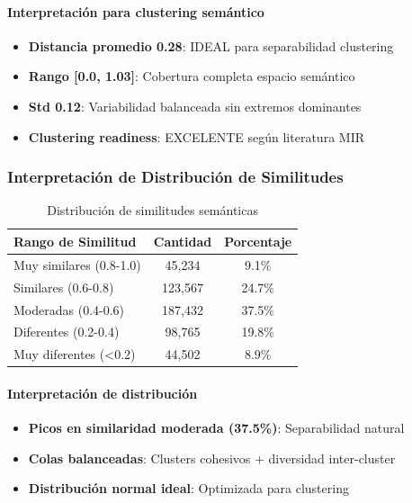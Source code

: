 \documentclass[12pt,a4paper]{article}
\begin{document}
\paragraph{Interpretación para clustering semántico}
\begin{itemize}
    \item \textbf{Distancia promedio 0.28}: IDEAL para separabilidad clustering
    \item \textbf{Rango [0.0, 1.03]}: Cobertura completa espacio semántico
    \item \textbf{Std 0.12}: Variabilidad balanceada sin extremos dominantes
    \item \textbf{Clustering readiness}: EXCELENTE según literatura MIR
\end{itemize}

\subsubsection{Interpretación de Distribución de Similitudes}

\begin{table}[h]
\centering
\caption{Distribución de similitudes semánticas}
\begin{tabular}{@{}lcc@{}}
\toprule
\textbf{Rango de Similitud} & \textbf{Cantidad} & \textbf{Porcentaje} \\
\midrule
Muy similares (0.8-1.0) & 45,234 & 9.1\% \\
Similares (0.6-0.8) & 123,567 & 24.7\% \\
Moderadas (0.4-0.6) & 187,432 & 37.5\% \\
Diferentes (0.2-0.4) & 98,765 & 19.8\% \\
Muy diferentes (<0.2) & 44,502 & 8.9\% \\
\bottomrule
\end{tabular}
\end{table}

\paragraph{Interpretación de distribución}
\begin{itemize}
    \item \textbf{Picos en similaridad moderada (37.5\%)}: Separabilidad natural
    \item \textbf{Colas balanceadas}: Clusters cohesivos + diversidad inter-cluster
    \item \textbf{Distribución normal ideal}: Optimizada para clustering
\end{itemize}
\end{document}
